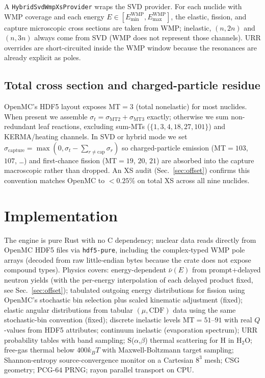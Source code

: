 \documentclass[11pt,a4paper]{article}
\begin{document}
A \texttt{HybridSvdWmpXsProvider} wraps the SVD provider. For
each nuclide with WMP coverage and each energy $E \in
[E_\text{min}^\text{WMP}, E_\text{max}^\text{WMP}]$, the
elastic, fission, and capture microscopic cross sections are
taken from WMP; inelastic, $(n,2n)$ and $(n,3n)$ always come
from SVD (WMP does not represent those channels). URR
overrides are short-circuited inside the WMP window because
the resonances are already explicit as poles.

\subsection{Total cross section and charged-particle residue}
\label{sec:total_xs}

OpenMC's HDF5 layout exposes MT$=3$ (total nonelastic) for
most nuclides. When present we assemble $\sigma_t =
\sigma_\text{MT2} + \sigma_\text{MT3}$ exactly; otherwise we
sum non-redundant leaf reactions, excluding sum-MTs
($\{1, 3, 4, 18, 27, 101\}$) and KERMA/heating channels. In
SVD or hybrid mode we set $\sigma_\text{capture} = \max(0,
\sigma_t - \sum_{r \neq \text{cap}} \sigma_r)$ so
charged-particle emission (MT$=103$, $107$, \ldots) and
first-chance fission (MT$=19$, $20$, $21$) are absorbed into
the capture macroscopic rather than dropped. An XS audit
(Sec.~\ref{sec:offset}) confirms this convention matches
OpenMC to $<\!0.25\%$ on total XS across all nine nuclides.

\section{Implementation}
\label{sec:impl}

The engine is pure Rust with no C dependency; nuclear data
reads directly from OpenMC HDF5 files via \texttt{hdf5-pure},
including the complex-typed WMP pole arrays (decoded from raw
little-endian bytes because the crate does not expose
compound types). Physics covers: energy-dependent
$\bar\nu(E)$ from prompt+delayed neutron yields (with the
per-energy interpolation of each delayed product fixed, see
Sec.~\ref{sec:offset}); tabulated outgoing energy
distributions for fission using OpenMC's stochastic bin
selection plus scaled kinematic adjustment (fixed); elastic
angular distributions from tabular $(\mu, \text{CDF})$ data
using the same stochastic-bin convention (fixed); discrete
inelastic levels MT$=51$--$91$ with real $Q$-values from HDF5
attributes; continuum inelastic (evaporation spectrum);
URR probability tables with band sampling;
S($\alpha$,$\beta$) thermal scattering for H in H$_2$O;
free-gas thermal below $400 k_B T$ with Maxwell-Boltzmann
target sampling; Shannon-entropy source-convergence monitor
on a Cartesian $8^3$ mesh; CSG geometry; PCG-$64$ PRNG; rayon
parallel transport on CPU.
\end{document}

